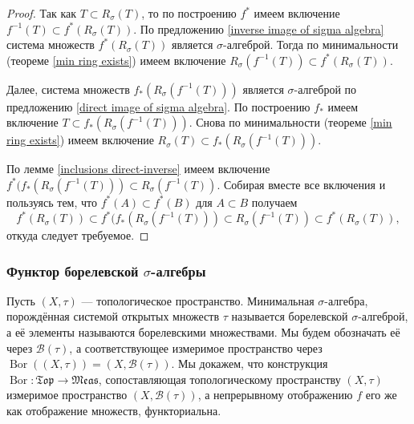\documentclass[12pt]{article}
\numberwithin{theorem}{section}
\theoremstyle{definition}
\newcommand{\defin}[2]{\hypertarget{#2}{{\color{red} #1}}}
\newcommand{\calB}{\mathcal{B}}
\newcommand{\Bor}{\operatorname{Bor}}
\newcommand{\Top}{\mathfrak{Top}}
\newcommand{\Meas}{\mathfrak{Meas}}
\begin{document}
	\begin{proof}
		Так как $ T \subset R_{\sigma}(T) $, то по построению $ f^* $ имеем включение $ f^{-1}(T) \subset f^*(R_{\sigma}(T)) $.
		По предложению \ref{inverse image of sigma algebra} система множеств $ f^*(R_{\sigma}(T)) $ является $ \sigma $-алгеброй.
		Тогда по минимальности (теореме \ref{min ring exists}) 
		имеем включение $ R_{\sigma}(f^{-1}(T)) \subset f^{*}(R_{\sigma}(T)) $.
		
		Далее, система множеств $ f_*(R_{\sigma}(f^{-1}(T))) $ является $ \sigma $-алгеброй по предложению
		\ref{direct image of sigma algebra}. По построению $ f_* $ имеем включение $ T \subset f_*(R_{\sigma}(f^{-1}(T))) $.
		Снова по минимальности (теореме \ref{min ring exists}) имеем включение $ R_{\sigma}(T) \subset f_*(R_{\sigma}(f^{-1}(T))) $.
		
		По лемме \ref{inclusions direct-inverse} имеем включение $ f^*(f_*(R_{\sigma}(f^{-1}(T))) \subset R_{\sigma}(f^{-1}(T)) $.
		Собирая вместе все включения и пользуясь тем, что $ f^*(A) \subset f^*(B) $ для $ A \subset B $ получаем
		$$ f^*(R_{\sigma}(T)) \subset f^*(f_*(R_{\sigma}(f^{-1}(T))) \subset R_{\sigma}(f^{-1}(T)) \subset f^{*}(R_{\sigma}(T)), $$
		откуда следует требуемое.
	\end{proof}
	
	
	\subsubsection{Функтор борелевской $ \sigma $-алгебры}
	
	Пусть $ (X, \tau) $ --- топологическое пространство.
	Минимальная $ \sigma $-алгебра, порождённая системой открытых множеств $ \tau $ 
	называется \defin{борелевской $ \sigma $-алгеброй}{borel-sigma-algebra},
	а её элементы называются \defin{борелевскими множествами}{borel-sets}.
	Мы будем обозначать её через $ \calB(\tau) $, а соответствующее измеримое пространство
	через $ \Bor((X, \tau)) = (X, \calB(\tau)) $.
	Мы докажем, что конструкция $ \Bor \colon \Top \to \Meas $, сопоставляющая топологическому пространству $ (X, \tau) $
	измеримое пространство $ (X, \calB(\tau)) $, а непрерывному отображению $ f $
	его же как отображение множеств, функториальна.
	
\end{document}
